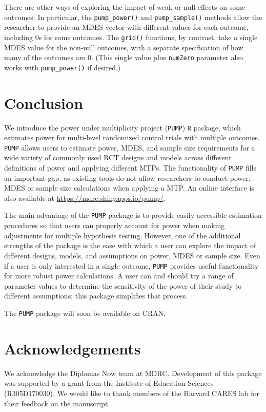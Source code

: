 \documentclass{article}
\begin{document}
There are other ways of exploring the impact of weak or null effects on
some outcomes. In particular, the \texttt{pump\_power()} and
\texttt{pump\_sample()} methods allow the researcher to provide an MDES
vector with different values for each outcome, including 0s for some
outcomes. The \texttt{grid()} functions, by contrast, take a single MDES
value for the non-null outcomes, with a separate specification of how
many of the outcomes are 0. (This single value plus \texttt{numZero}
parameter also works with \texttt{pump\_power()} if desired.)

\section{Conclusion}
\label{sec:conclusion}

We introduce the power under multiplicity project (\texttt{PUMP})
\texttt{R} package, which estimates power for multi-level randomized
control trials with multiple outcomes. \texttt{PUMP} allows users to
estimate power, MDES, and sample size requirements for a wide variety of
commonly used RCT designs and models across different definitions of
power and applying different MTPs. The functionality of \texttt{PUMP}
fills an important gap, as existing tools do not allow researchers to
conduct power, MDES or sample size calculations when applying a MTP. An
online interface is also available at
\url{https://mdrc.shinyapps.io/pump/}.

The main advantage of the \texttt{PUMP} package is to provide easily
accessible estimation procedures so that users can properly account for
power when making adjustments for multiple hypothesis testing. However,
one of the additional strengths of the package is the ease with which a
user can explore the impact of different designs, models, and
assumptions on power, MDES or sample size. Even if a user is only
interested in a single outcome, \texttt{PUMP} provides useful
functionality for more robust power calculations. A user can and should
try a range of parameter values to determine the sensitivity of the
power of their study to different assumptions; this package simplifies
that process.

The \texttt{PUMP} package will soon be available on CRAN.

\section*{Acknowledgements}

We acknowledge the Diplomas Now team at MDRC. Development of this
package was supported by a grant from the Institute of Education
Sciences (R305D170030). We would like to thank members of the Harvard
CARES lab for their feedback on the manuscript.
\end{document}
